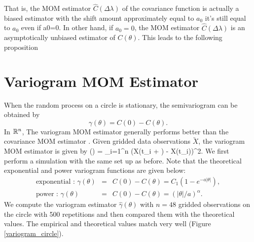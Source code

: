 That is, the MOM estimator $\hat{C}(\Delta \lambda)$ of the covariance function is actually a biased estimator with the shift amount approximately equal to $a_0$ it's still equal to $a_0$ even if a0=0. In other hand, if $a_0 = 0$, the MOM estimator $\hat{C}(\Delta \lambda)$ is an asymptotically unbiased estimator of $C(\theta)$. This leads to the following proposition



\section{Variogram MOM Estimator}

When the random process on a circle is stationary, the semivariogram can be obtained by
\[
\gamma(\theta) = C(0) - C(\theta).
\]
In $\mathbb{R}^n$, The variogram MOM estimator generally performs better than the covariance MOM estimator \citep{Cressie1993}. Given gridded data observations $\utilde{X}$, the variogram MOM estimator is given by
\beq
\hat{\gamma}(\Delta \lambda) =  \sum_{i=1}^n (X(t_i + \Delta \lambda) - X(t_i))^2.
\eeq
We first perform a simulation with the same set up as before. Note that the theoretical exponential and power variogram functions are given below:
\begin{eqnarray*}
	\mbox{exponential : }\gamma(\theta) &=& C(0) - C(\theta) = C_1(1-e^{-a|\theta|}), \\
	\mbox{power : } \gamma(\theta) &=& C(0) - C(\theta) = (|\theta|/a)^{\alpha}.
\end{eqnarray*}
We compute the variogram estimator $\hat{\gamma}(\theta)$ with $n = 48$ gridded observations on the circle with 500 repetitions and then compared them with the theoretical values. The empirical and theoretical values match very well (Figure \ref{variogram_circle}).\\

